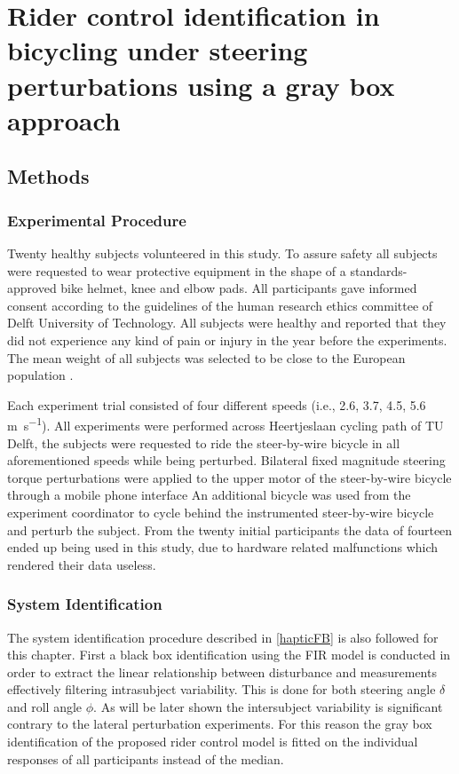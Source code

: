 \chapter{Rider control identification in bicycling under steering perturbations using a gray box approach} \label{ch:4}

\section{Methods}

\subsection{Experimental Procedure}

Twenty healthy subjects volunteered in this study. To assure safety all subjects were requested to wear protective equipment in the shape of a standards-approved bike helmet, knee and elbow pads. All participants gave informed consent according to the guidelines of the human research ethics committee of Delft University of Technology. All subjects were healthy and reported that they did not experience any kind of pain or injury in the year before the experiments. The mean weight of all subjects was selected to be close to the European population \cite{walpole2012weight}.

Each experiment trial consisted of four different speeds (i.e., 2.6, 3.7, 4.5, 5.6 \si{\meter\per s}). All experiments were performed across Heertjeslaan cycling path of TU Delft, the subjects were requested to ride the steer-by-wire bicycle in all aforementioned speeds while being  perturbed. Bilateral fixed magnitude steering torque  perturbations were applied to the upper motor of the steer-by-wire bicycle through a mobile phone interface  An additional bicycle was used from the experiment coordinator to cycle behind  the instrumented steer-by-wire bicycle and perturb the subject. From the twenty initial participants the data of fourteen ended up being used in this study, due to hardware related malfunctions which rendered their data useless.
\subsection{System Identification} 
The system identification procedure described in \cref{hapticFB} is also followed for this chapter. First a black box identification using the FIR model is conducted in order to  extract the linear relationship between disturbance and measurements effectively filtering intrasubject variability. This is done for both steering angle \ensuremath{\delta} and roll angle \ensuremath{\phi}. As will be later shown the intersubject variability is significant contrary to the lateral perturbation experiments. For this reason the gray box identification of the proposed rider control model is fitted on the individual responses of all participants instead of the median.
